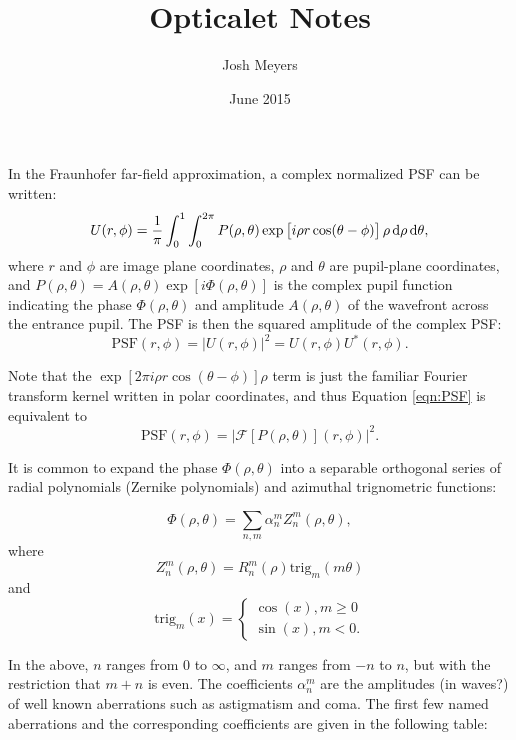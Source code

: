 \documentclass{article}
\title{Opticalet Notes}
\author{Josh Meyers}
\date{June 2015}
\newcommand{\trig}{\mathrm{trig}}
\begin{document}
In the Fraunhofer far-field approximation, a complex normalized PSF can be written:
\begin{equation}
  \label{eqn:cPSF}
  U(r, \phi) = \frac{1}{\pi} \int_0^1 \int_0^{2\pi} P(\rho, \theta) \exp\left[i \rho r \cos(\theta - \phi)\right]\rho \dif{\rho} \dif{\theta}, 
\end{equation}
where $r$ and $\phi$ are image plane coordinates, $\rho$ and $\theta$ are pupil-plane coordinates, and $P(\rho, \theta) = A(\rho, \theta) \exp\left[i \Phi(\rho, \theta)\right]$ is the complex pupil function indicating the phase $\Phi(\rho, \theta)$ and amplitude $A(\rho, \theta)$ of the wavefront across the entrance pupil.  The PSF is then the squared amplitude of the complex PSF:
\begin{equation}
  \label{eqn:PSF}
  \mathrm{PSF}(r, \phi) = \left|U(r, \phi)\right|^2 = U(r, \phi) U^*(r, \phi).
\end{equation}

Note that the $\exp\left[2\pi i \rho r \cos(\theta - \phi)\right]\rho$ term is just the familiar Fourier transform kernel written in polar coordinates, and thus Equation \ref{eqn:PSF} is equivalent to
\begin{equation}
  \label{eqn:FT_PSF}
  \mathrm{PSF}(r, \phi) = \left|\mathcal{F}\left[P(\rho, \theta)\right](r, \phi)\right|^2.
\end{equation}

It is common to expand the phase $\Phi(\rho, \theta)$ into a separable orthogonal series of radial polynomials (Zernike polynomials) and azimuthal trignometric functions:

\begin{equation}
  \Phi(\rho, \theta) = \sum_{n,m}\alpha_n^m Z_n^m(\rho, \theta),
\end{equation}
where
\begin{equation}
  Z_n^m(\rho, \theta) = R^m_n(\rho) \trig_m(m \theta)
\end{equation}
and
\begin{equation}
  \trig_m(x) = 
  \begin{cases}
    \cos(x), m \ge 0 \\
    \sin(x), m < 0.
  \end{cases}
\end{equation}

In the above, $n$ ranges from $0$ to $\infty$, and $m$ ranges from $-n$ to $n$, but with the restriction that $m+n$ is even.
The coefficients $\alpha_n^m$ are the amplitudes (in waves?) of well known aberrations such as astigmatism and coma.  The first few named aberrations and the corresponding coefficients are given in the following table:
\end{document}
